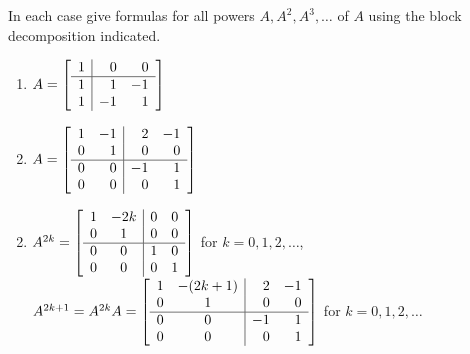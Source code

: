 \begin{multicols}{2}
\begin{ex}
In each case give formulas for all powers $A, A^{2}, A^{3}, \dots$ of $A$ using the block decomposition indicated.


\begin{enumerate}[label={\alph*.}]
\item
$A = \left[ \begin{array}{r|rr}
1 & 0 & 0 \\
\hline
1 & 1  & -1\\
1 & -1 & 1
\end{array} \right]
$

\item
$A = \left[ \begin{array}{rr|rr}
1 & -1 & 2 & -1 \\
0 & 1 & 0 & 0 \\
\hline
0 & 0 & -1 & 1 \\
0 & 0 & 0 & 1
\end{array} \right]
$

\end{enumerate}
\begin{sol}
\begin{enumerate}[label={\alph*.}]
\setcounter{enumi}{1}
\item
$
A^{2k} = \left[ \begin{array}{rc|rr}
1 & -2k & 0 & 0 \\
0 & 1 & 0 & 0 \\
\hline
0 & 0 & 1 & 0 \\
0 & 0 & 0 & 1
\end{array} \right]$ for $k = 0, 1, 2, \dots$, \\ 
$A^{2k + 1} = A^{2k}A = \left[ \begin{array}{rc|rr}
1 & -(2k + 1) & 2 & -1 \\
0 & 1 & 0 & 0 \\
\hline
0 & 0 & -1 & 1 \\
0 & 0 & 0 & 1
\end{array} \right]$ for $k = 0, 1, 2, \dots$

\end{enumerate}
\end{sol}
\end{ex}


\end{multicols}
